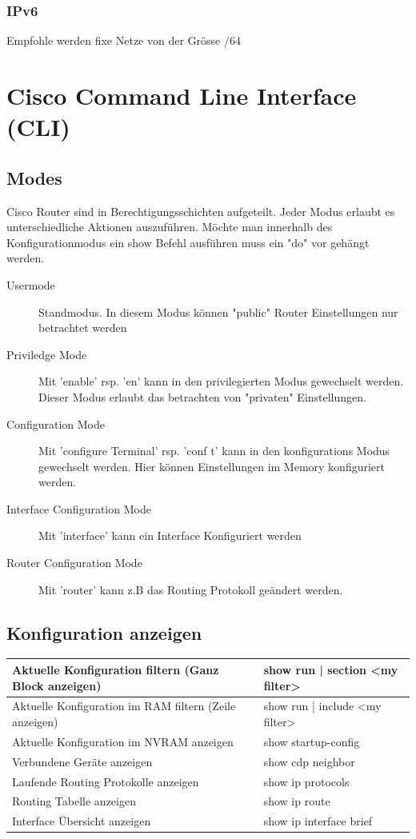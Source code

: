 \subsubsection{IPv6}
Empfohle werden fixe Netze von der Grösse /64
	
\section{Cisco Command Line Interface (CLI)}

\subsection{Modes}
Cisco Router sind in Berechtigungsschichten aufgeteilt. Jeder Modus erlaubt es unterschiedliche Aktionen auszuführen. Möchte man innerhalb des Konfigurationmodus ein show Befehl ausführen muss ein "do" vor gehängt werden.
\begin{description}
	\item[Usermode] Standmodus. In diesem Modus können "public" Router Einstellungen nur betrachtet werden
	\item[Priviledge Mode] Mit 'enable' rsp. 'en' kann in den privilegierten Modus gewechselt werden. Dieser Modus erlaubt das betrachten von "privaten" Einstellungen.
	\item[Configuration Mode] Mit 'configure Terminal' rsp. 'conf t' kann in den konfigurations Modus gewechselt werden. Hier können Einstellungen im Memory konfiguriert werden.
	\item[Interface Configuration Mode] Mit 'interface' kann ein Interface Konfiguriert werden
	\item[Router Configuration Mode] Mit 'router' kann z.B das Routing Protokoll geändert werden.
\end{description}

\subsection{Konfiguration anzeigen}
\begin{tabu} to \linewidth {|X|X|}
	\hline
	Aktuelle Konfiguration filtern (Ganz Block anzeigen) 	& show run | section <my filter>\\ 
	\hline
	Aktuelle Konfiguration im RAM filtern (Zeile anzeigen) 	& show run | include <my filter> \\ 
	\hline
	Aktuelle Konfiguration im NVRAM anzeigen	& show startup-config \\ 
	\hline
	Verbundene Geräte anzeigen	& show cdp neighbor \\ 
	\hline
	Laufende Routing Protokolle anzeigen 	& show ip protocols \\ 
	\hline
	Routing Tabelle anzeigen	&  show ip route \\ 
	\hline
	Interface Übersicht anzeigen	&  show ip interface brief \\ 
	\hline
\end{tabu}

